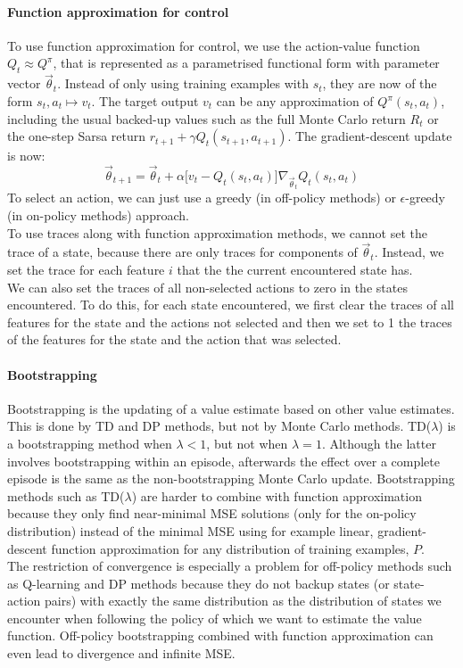 \documentclass[a4paper]{article}
\begin{document}
\paragraph{Function approximation for control}
To use function approximation for control, we use the action-value function $Q_t \approx Q^{\pi}$, that is represented as a parametrised functional form with parameter vector $\overrightarrow{\theta}_t$. Instead of only using training examples with $s_t$, they are now of the form $s_t, a_t \mapsto v_t$. The target output $v_t$ can be any approximation of $Q^{\pi}(s_t,a_t)$, including the usual backed-up values such as the full Monte Carlo return $R_t$ or the one-step Sarsa return $r_{t+1} + \gamma Q_t(s_{t+1}, a_{t+1})$. The gradient-descent update is now:
\begin{equation}
\overrightarrow{\theta}_{t+1} = \overrightarrow{\theta}_t + \alpha \big[ v_t - Q_t(s_t,a_t) \big] \nabla_{\overrightarrow{\theta}_t} Q_t(s_t,a_t)
\end{equation}
To select an action, we can just use a greedy (in off-policy methods) or $\epsilon$-greedy (in on-policy methods) approach.\\
To use traces along with function approximation methods, we cannot set the trace of a state, because there are only traces for components of $\overrightarrow{\theta}_t$. Instead, we set the trace for each feature $i$ that the the current encountered state has.\\
We can also set the traces of all non-selected actions to zero in the states encountered. To do this, for each state encountered, we first clear the traces of all features for the state and the actions not selected and then we set to 1 the traces of the features for the state and the action that was selected.\\

\paragraph{Bootstrapping}
Bootstrapping is the updating of a value estimate based on other value estimates. This is done by TD and DP methods, but not by Monte Carlo methods. TD($\lambda$) is a bootstrapping method when $\lambda <1$, but not when $\lambda = 1$. Although the latter involves bootstrapping within an episode, afterwards the effect over a complete episode is the same as the non-bootstrapping Monte Carlo update. Bootstrapping methods such as TD($\lambda$) are harder to combine with function approximation because they only find near-minimal MSE solutions (only for the on-policy distribution) instead of the minimal MSE using for example linear, gradient-descent function approximation for any distribution of training examples, $P$.\\
The restriction of convergence is especially a problem for off-policy methods such as Q-learning and DP methods because they do not backup states (or state-action pairs) with exactly the same distribution as the distribution of states we encounter when following the policy of which we want to estimate the value function. Off-policy bootstrapping combined with function approximation can even lead to divergence and infinite MSE.\\
\end{document}
